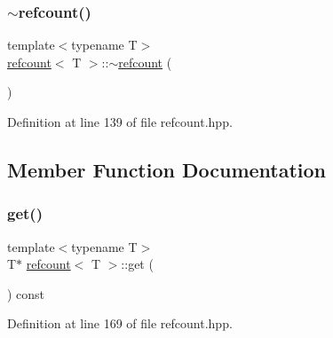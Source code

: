 \mbox{\label{structrefcount_aa4a1e2bb371224f7bbb4703e2bb137c0}} 
\subsubsection{\texorpdfstring{$\sim$refcount()}{~refcount()}}
{\footnotesize\ttfamily template$<$typename T$>$ \\
\hyperlink{structrefcount}{refcount}$<$ T $>$\+::$\sim$\hyperlink{structrefcount}{refcount} (\begin{DoxyParamCaption}{ }\end{DoxyParamCaption})\hspace{0.3cm}{\ttfamily [inline]}}



Definition at line 139 of file refcount.\+hpp.



\subsection{Member Function Documentation}
\mbox{\label{structrefcount_ad8aa243007f3818b8e7a69f57b92cda0}} 
\subsubsection{\texorpdfstring{get()}{get()}}
{\footnotesize\ttfamily template$<$typename T$>$ \\
T$\ast$ \hyperlink{structrefcount}{refcount}$<$ T $>$\+::get (\begin{DoxyParamCaption}{ }\end{DoxyParamCaption}) const\hspace{0.3cm}{\ttfamily [inline]}}



Definition at line 169 of file refcount.\+hpp.




